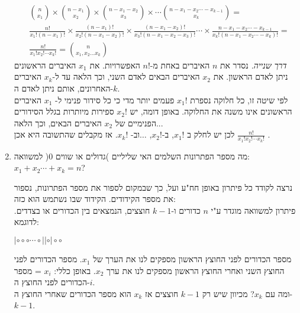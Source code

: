 \documentclass[12pt,a4paper]{article}
\begin{document}
\begin{enumerate}[label=\textcolor{BurntOrange}{שאלה \arabic*: }]
\begin{Solution}
\begin{equation*}
\begin{split}
&\binom{n}{x_1} \times \binom{n-x_1}{x_2} \times \binom{n-x_1-x_2}{x_3} \times \cdots \binom{n-x_1 - x_2 \cdots - x_{k-1}}{x_k} = \\
& \frac{n!}{x_1 ! (n-x_1)!} \times \frac{(n-x_1)!}{x_2!(n-x_1-x_2)!} \times \frac{(n-x_1-x_2)!}{x_3!(n-x_1-x_2-x_3)!}\cdots \times \frac{n - x_1 - x_2 \cdots -x_{k-1}}{x_{k}!(n - x_1 - x_2 \cdots - x_{k})!} = \\
& \frac{n!}{x_1 ! x_2 ! \cdots x_k !} = \binom{n}{x_1 , x_2 \dots x_k}
\end{split}
\end{equation*}
\textit{דרך שנייה.} נסדר את $n$ האיברים באחת מ-$n!$ האפשרויות. את $x_1$ האיברים הראשונים ניתן לאדם הראשון. את $x_2$ האיברים הבאים לאדם השני, וכך הלאה עד ל-$x_k$ האיברים האחרונים, אותם ניתן לאדם ה-$k$. \\
לפי שיטה זו, כל חלוקה נספרת $x_1 !$ פעמים יותר מדי כי כל סידור פנימי ל- $x_1$ האיברים הראשונים אינו משנה את החלוקה. באופן דומה, יש $x_2 !$ ספירות מיותרות בגלל הסידורים הפנימיים של $x_2$ האיברים הבאים, וכך הלאה...\\
לכן יש לחלק ב $x_1 !$, ב-$x_2!$, $\dots$וב- $x_k !$. אז מקבלים שהתשובה היא אכן $\frac{n!}{x_1 ! x_2 ! \cdots x_k! }$ .
\end{Solution}
\item מה מספר הפתרונות השלמים האי שליליים )גדולים או שווים 0( למשוואה: $x_1 + x_2 \cdots + x_k =n$?
\begin{Solution}
נרצה לקודד כל פיתרון באופן חח"ע ועל, כך שבמקום לספור את מספר הפתרונות, נספור את מספר הקידודים. הקידוד שבו נשתמש הוא כזה: \\
פיתרון למשוואה מוגדר ע"י $n$ כדורים ו-$k-1$ חוצצים, הנמצאים בין הכדורים או בצדדים. לדוגמא:
\begin{center}
$| \circ \circ \circ \cdots \circ|| \circ| \circ \circ$
\end{center}
מספר הכדורים לפני החוצץ הראשון מספקים לנו את הערך של $x_1$. מספר הכדורים לפני החוצץ השני ואחרי החוצץ הראשון מספקים לנו את ערך $x_2$. באופן כללי: $x_i$ = מספר הכדורים לפני החוצץ ה-$i$.\\
ומה עם $x_k$? מכיוון שיש רק $k-1$ חוצצים אז $x_k$ הוא מספר הכדורים שאחרי החוצץ ה-$k-1$.


\end{Solution}
\end{enumerate}
\end{document}
